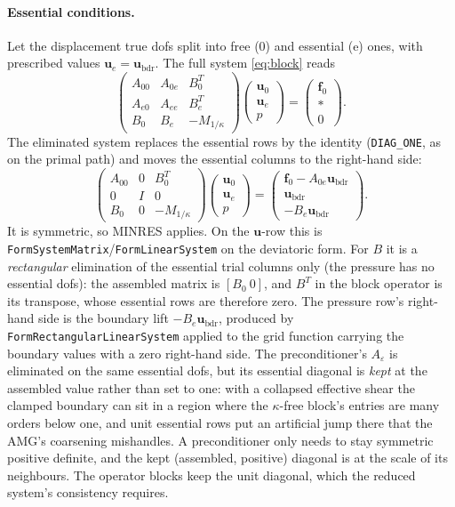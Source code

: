 \documentclass[11pt]{article}
\numberwithin{equation}{section}
\theoremstyle{remark}
\newcommand{\eps}{\varepsilon}
\newcommand{\vu}{\mathbf{u}}
\newcommand{\vf}{\mathbf{f}}
\newcommand{\Ae}{A_{\eps}}
\newcommand{\Mk}{M_{1/\kappa}}
\newcommand{\code}[1]{\texttt{#1}}
\begin{document}
\paragraph{Essential conditions.} Let the displacement true dofs split
into free (0) and essential (e) ones, with prescribed values
$\vu_e = \vu_{\mathrm{bdr}}$. The full system \eqref{eq:block} reads
\[
  \begin{pmatrix}
    A_{00} & A_{0e} & B_0^T\\
    A_{e0} & A_{ee} & B_e^T\\
    B_0 & B_e & -\Mk
  \end{pmatrix}
  \begin{pmatrix}\vu_0\\ \vu_e\\ p\end{pmatrix}
  =
  \begin{pmatrix}\vf_0\\ \ast\\ 0\end{pmatrix} .
\]
The eliminated system replaces the essential rows by the identity
(\code{DIAG\_ONE}, as on the primal path) and moves the essential columns
to the right-hand side:
\begin{equation}
  \begin{pmatrix}
    A_{00} & 0 & B_0^T\\
    0 & I & 0\\
    B_0 & 0 & -\Mk
  \end{pmatrix}
  \begin{pmatrix}\vu_0\\ \vu_e\\ p\end{pmatrix}
  =
  \begin{pmatrix}\vf_0 - A_{0e}\vu_{\mathrm{bdr}}\\
  \vu_{\mathrm{bdr}}\\ -B_e\vu_{\mathrm{bdr}}\end{pmatrix} .
  \label{eq:eliminated}
\end{equation}
It is symmetric, so MINRES applies. On the $\vu$-row this is
\code{FormSystemMatrix}/\code{FormLinearSystem} on the deviatoric form.
For $B$ it is a \emph{rectangular} elimination of the essential trial
columns only (the pressure has no essential dofs): the assembled matrix is
$[B_0\ 0]$, and $B^T$ in the block operator is its transpose, whose
essential rows are therefore zero. The pressure row's right-hand side is
the boundary lift $-B_e\vu_{\mathrm{bdr}}$, produced by
\code{FormRectangularLinearSystem} applied to the grid function carrying
the boundary values with a zero right-hand side. The preconditioner's
$\Ae$ is eliminated on the same essential dofs, but its essential
diagonal is \emph{kept} at the assembled value rather than set to one:
with a collapsed effective shear the clamped boundary can sit in a
region where the $\kappa$-free block's entries are many orders below
one, and unit essential rows put an artificial jump there that the
AMG's coarsening mishandles. A preconditioner only needs to stay
symmetric positive definite, and the kept (assembled, positive)
diagonal is at the scale of its neighbours. The operator blocks keep
the unit diagonal, which the reduced system's consistency requires.
\end{document}
